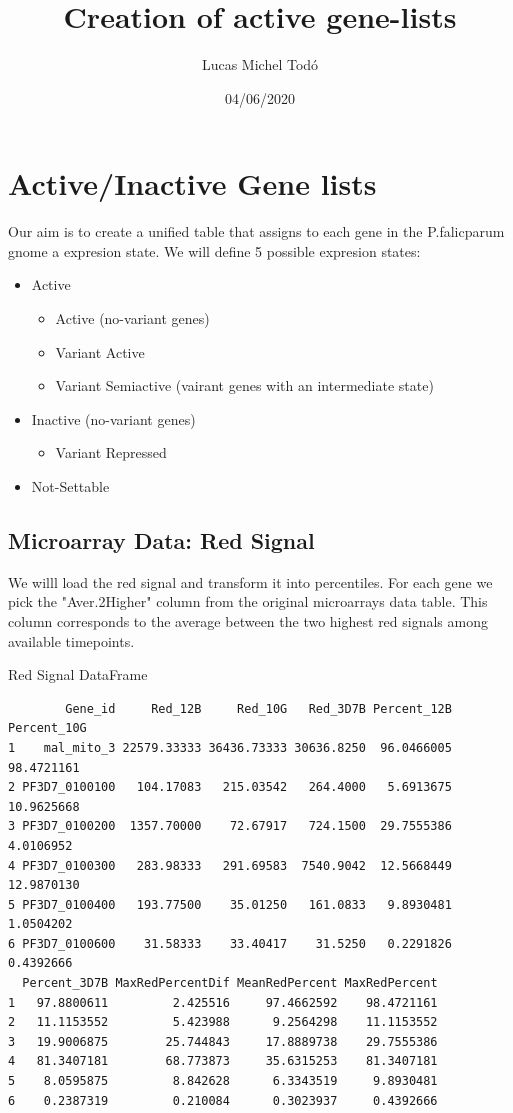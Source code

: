 \documentclass[11pt]{article}
\author{Lucas Michel Todó}
\date{04/06/2020}
\title{Creation of active gene-lists}
\begin{document}
\maketitle
\tableofcontents \clearpage
\section{Active/Inactive Gene lists}
\label{sec:orgda8ac95}
Our aim is to create a unified table that assigns to each gene in the P.falicparum gnome a expresion state.
We will define 5 possible expresion states:

\begin{itemize}
\item Active
\begin{itemize}
\item Active (no-variant genes)
\item Variant Active
\item Variant Semiactive (vairant genes with an intermediate state)
\end{itemize}

\item Inactive (no-variant genes)
\begin{itemize}
\item Variant Repressed
\end{itemize}

\item Not-Settable
\end{itemize}

\subsection{Microarray Data: Red Signal}
\label{sec:orgdb27606}
We willl load the red signal and transform it into percentiles. For each gene we pick the "Aver.2Higher" column from the original microarrays data table. This column corresponds to the average between the two highest red signals among available timepoints.

Red Signal DataFrame
\begin{verbatim}
        Gene_id     Red_12B     Red_10G   Red_3D7B Percent_12B Percent_10G
1    mal_mito_3 22579.33333 36436.73333 30636.8250  96.0466005  98.4721161
2 PF3D7_0100100   104.17083   215.03542   264.4000   5.6913675  10.9625668
3 PF3D7_0100200  1357.70000    72.67917   724.1500  29.7555386   4.0106952
4 PF3D7_0100300   283.98333   291.69583  7540.9042  12.5668449  12.9870130
5 PF3D7_0100400   193.77500    35.01250   161.0833   9.8930481   1.0504202
6 PF3D7_0100600    31.58333    33.40417    31.5250   0.2291826   0.4392666
  Percent_3D7B MaxRedPercentDif MeanRedPercent MaxRedPercent
1   97.8800611         2.425516     97.4662592    98.4721161
2   11.1153552         5.423988      9.2564298    11.1153552
3   19.9006875        25.744843     17.8889738    29.7555386
4   81.3407181        68.773873     35.6315253    81.3407181
5    8.0595875         8.842628      6.3343519     9.8930481
6    0.2387319         0.210084      0.3023937     0.4392666
\end{verbatim}
\end{document}
